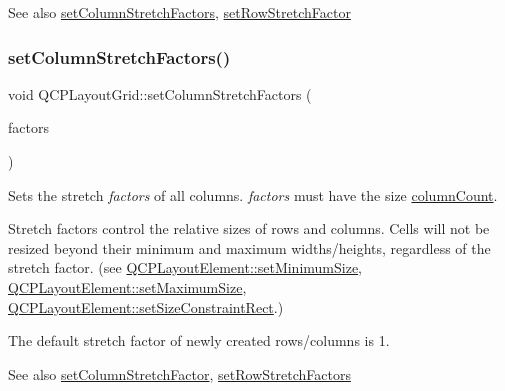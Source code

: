 \begin{DoxySeeAlso}{See also}
\hyperlink{classQCPLayoutGrid_a6c2591d1a7e2534ce036989543b49e57}{set\+Column\+Stretch\+Factors}, \hyperlink{classQCPLayoutGrid_a7b0273de5369bd93d942edbaf5b166ec}{set\+Row\+Stretch\+Factor} 
\end{DoxySeeAlso}
\mbox{\label{classQCPLayoutGrid_a6c2591d1a7e2534ce036989543b49e57}} 
\subsubsection{\texorpdfstring{set\+Column\+Stretch\+Factors()}{setColumnStretchFactors()}}
{\footnotesize\ttfamily void Q\+C\+P\+Layout\+Grid\+::set\+Column\+Stretch\+Factors (\begin{DoxyParamCaption}\item[{const Q\+List$<$ double $>$ \&}]{factors }\end{DoxyParamCaption})}

Sets the stretch {\itshape factors} of all columns. {\itshape factors} must have the size \hyperlink{classQCPLayoutGrid_a1a2962cbf45011405b64b913afa8e7a2}{column\+Count}.

Stretch factors control the relative sizes of rows and columns. Cells will not be resized beyond their minimum and maximum widths/heights, regardless of the stretch factor. (see \hyperlink{classQCPLayoutElement_a5dd29a3c8bc88440c97c06b67be7886b}{Q\+C\+P\+Layout\+Element\+::set\+Minimum\+Size}, \hyperlink{classQCPLayoutElement_a74eb5280a737ab44833d506db65efd95}{Q\+C\+P\+Layout\+Element\+::set\+Maximum\+Size}, \hyperlink{classQCPLayoutElement_a361666cdcc6fbfd37344cc44be746b0f}{Q\+C\+P\+Layout\+Element\+::set\+Size\+Constraint\+Rect}.)

The default stretch factor of newly created rows/columns is 1.

\begin{DoxySeeAlso}{See also}
\hyperlink{classQCPLayoutGrid_ae38f31a71687b9d7ee3104852528fb50}{set\+Column\+Stretch\+Factor}, \hyperlink{classQCPLayoutGrid_a200b45f9c908f96ebadaa3c8d87a2782}{set\+Row\+Stretch\+Factors} 
\end{DoxySeeAlso}
\mbox{\label{classQCPLayoutGrid_affc2f3cfd22f28698c5b29b960d2a391}} 
